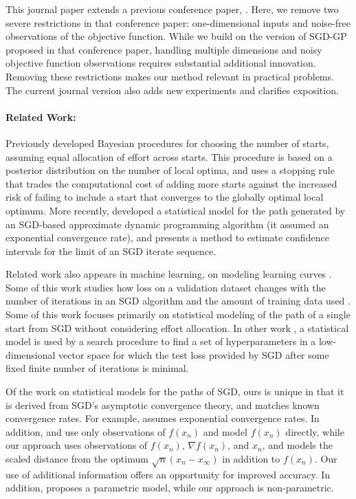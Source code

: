 \documentclass[12pt,english]{article}
\begin{document}
This journal paper extends a previous conference paper, \cite{multi_start}. Here, we remove two severe restrictions in that conference paper: one-dimensional inputs and noise-free observations of the objective function.  While we build on the version of SGD-GP proposed in that conference paper, handling multiple dimensions and noisy objective function observations requires substantial additional innovation.  Removing these restrictions makes our method relevant in practical problems.
The current journal version also adds new experiments and clarifies exposition.


\paragraph{Related Work:}
Previously \cite{boender:1987} developed Bayesian procedures for choosing the number of starts, assuming equal allocation of effort across starts.
This procedure is based on a posterior distribution on the number of local optima, and uses a stopping rule that trades the computational cost of adding more starts against the increased risk of failing to include a start that converges to the globally optimal local optimum. More recently, \cite{frazier2009calibration} developed a statistical model for the path generated by an SGD-based approximate dynamic programming algorithm (it assumed an exponential convergence rate), and \cite{chen2016} presents a method to estimate confidence intervals for the limit of an SGD iterate sequence.


Related work also appears in machine learning, on modeling learning curves \citep{Swersky:2014,Hutter:2015,klein2016fast,boca2017,li2016}. Some of this work studies how loss on a validation dataset changes with the number of iterations in an SGD algorithm  \citep{Swersky:2014,Hutter:2015} and the amount of training data used  \citep{klein2016fast}. 
Some of this work   \citep{Hutter:2015} focuses primarily on statistical modeling of the path of a single start from SGD without considering effort allocation.  In other work  \citep{Swersky:2014,klein2016fast}, a statistical model is used by a search procedure to find a set of hyperparameters in a low-dimensional vector space for which the test loss provided by SGD after some fixed finite number of iterations is minimal.  

Of the work on statistical models for the paths of SGD, ours is unique in that it is derived from SGD's asymptotic convergence theory, and matches known convergence rates.  For example, \cite{Swersky:2014} assumes exponential convergence rates.
In addition, \cite{Swersky:2014} and \cite{Hutter:2015} use only observations of $f(x_{n})$ and model $f(x_n)$ directly, while our approach uses observations of $f(x_n)$, $\nabla f(x_n)$, and $x_n$, and models the scaled distance from the optimum $\sqrt{n}(x_{n}-x_{\infty})$ in addition to $f(x_n)$.
Our use of additional information offers an opportunity for improved accuracy.
In addition, \cite{Hutter:2015} proposes a parametric model, while our approach is non-parametric.
\end{document}
